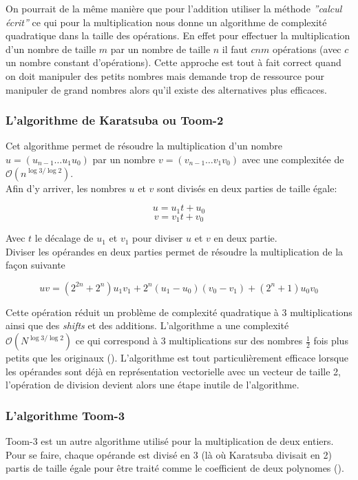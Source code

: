 \documentclass[letterpaper]{article}
\begin{document}
On pourrait de la même manière que pour l'addition utiliser la méthode
\emph{''calcul écrit''} ce qui pour la multiplication nous donne un algorithme de
complexité quadratique dans la taille des opérations.
En effet pour effectuer la multiplication d'un nombre de taille $m$ par un nombre
de taille $n$ il faut $cnm$ opérations (avec $c$ un nombre constant
d'opérations).
Cette approche est tout à fait correct quand on doit manipuler des petits
nombres mais demande trop de ressource pour manipuler de grand nombres alors
qu'il existe des alternatives plus efficaces.

\subsubsection{L'algorithme de Karatsuba ou Toom-2}

Cet algorithme permet de résoudre la multiplication d'un nombre
$u = (u_{n-1} \dots u_1 u_0)$ par un nombre $v = (v_{n-1} \dots v_1 v_0)$
avec une complexitée de $\mathcal{O}(n^{\log{3}/\log{2}})$.\\

Afin d'y arriver, les nombres $u$ et $v$ sont divisés en deux parties de taille
égale:

  $$u = u_1 t + u_0$$
  $$v = v_1 t + v_0$$

Avec $t$ le décalage de $u_1$ et $v_1$ pour diviser $u$ et $v$ en deux partie.\\

Diviser les opérandes en deux parties permet de résoudre la multiplication
de la façon suivante

  $$uv = (2^{2n} + 2^n) u_1 v_1 + 2^n (u_1 - u_0) (v_0 - v_1) + (2^n + 1) u_0 v_0$$

Cette opération réduit un problème de complexité quadratique à 3 multiplications
ainsi que des \emph{shifts} et des additions.
L'algorithme a une complexité $\mathcal{O}(N^{\log{3}/\log{2}})$ ce  qui
correspond à $3$ multiplications sur des nombres $\frac{1}{2}$ fois plus petits
que les originaux (\cite{gmplibkaratsuba}).
L'algorithme est tout particulièrement efficace lorsque les opérandes sont déjà
en représentation vectorielle avec un vecteur de taille 2, l'opération de
division devient alors une étape inutile de l'algorithme.

\subsubsection{L'algorithme Toom-3}

Toom-3 est un autre algorithme utilisé pour la multiplication de deux
entiers. Pour se faire, chaque opérande est divisé en 3 (là où Karatsuba
divisait en 2) partis de taille égale pour être traité comme le
coefficient de deux polynomes (\cite{gmplib2014}).
\end{document}
